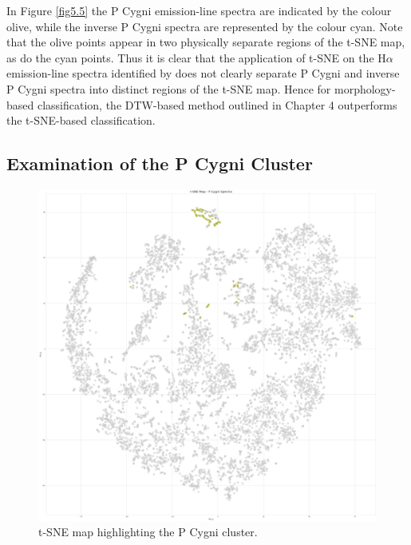 In Figure \ref{fig5.5} the P Cygni emission-line spectra are indicated by the colour olive, while the inverse P Cygni spectra are represented by the colour cyan. Note that the olive points appear in two physically separate regions of the t-SNE map, as do the cyan points. Thus it is clear that the application of t-SNE on the H$\alpha$ emission-line spectra identified by \citet{vcotar2021galah} does not clearly separate P Cygni and inverse P Cygni spectra into distinct regions of the t-SNE map. Hence for morphology-based classification, the DTW-based method outlined in Chapter 4 outperforms the t-SNE-based classification.

\subsection{Examination of the P Cygni Cluster}

\begin{figure}[!htb]
\centering
\includegraphics[scale=0.14]{figures/t-sne p cygni only.png}
\caption{t-SNE map highlighting the P Cygni cluster.}
\end{figure}

